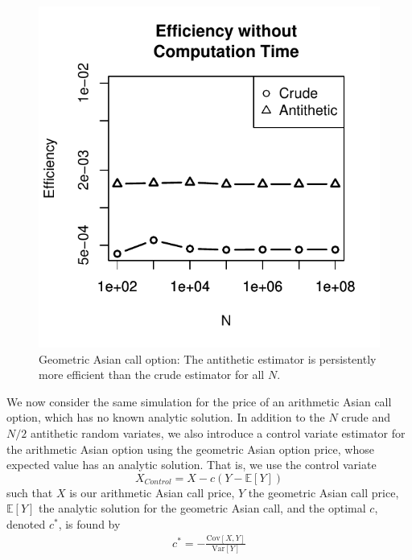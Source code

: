 \documentclass[12pt]{article}
\newlength\tindent
\renewcommand{\indent}{\hspace*{\tindent}}
\begin{document}
\begin{figure}[H]
	\centering
	\includegraphics[scale=0.75]{../plots/q3/geo_asian_call_eff_wo_time.pdf}
\caption{Geometric Asian call option: The antithetic estimator is persistently more efficient than the crude estimator for all $N$.}
\label{fig:geo_asset_time_eff}
\end{figure}

\indent We now consider the same simulation for the price of an arithmetic Asian call option, which has no known analytic solution. In addition to the $N$ crude and $N/2$ antithetic random variates, we also introduce a control variate estimator for the arithmetic Asian option using the geometric Asian option price, whose expected value has an analytic solution. That is, we use the control variate
\begin{equation*}
	X_{Control} = X - c \left( Y - \mathbb E\left [ Y \right] \right)
\end{equation*}
such that $X$ is our arithmetic Asian call price, $Y$ the geometric Asian call price, $\mathbb E[Y]$ the analytic solution for the geometric Asian call, and the optimal $c$, denoted $c^*$, is found by
\begin{align*}
	c^* = -\frac{ \mathrm{Cov}[X, Y] }{ \mathrm{Var}[Y] }
\end{align*}
\end{document}
